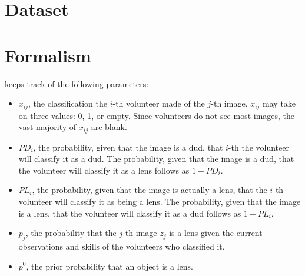 \documentclass[useAMS,usenatbib,a4paper]{mn2e}
\begin{document}

\section{Dataset}



\section{Formalism}
\label{sec:formalism}


\sw keeps track of the following parameters:
\begin{itemize}
  \item{$x_{ij}$, the classification the $i$-th volunteer made of the $j$-th
      image. $x_{ij}$ may take on three values:
      0, 1, or empty. Since volunteers do not see most images, the vast
    majority of $x_{ij}$ are blank.}
    \item{$PD_{i}$, the probability, given that the image is a dud, that
        $i$-th the volunteer will classify it as a dud. The
      probability, given that the image is a dud, that the volunteer will
    classify it as a lens follows as $1 - PD_{i}$.}
  \item{$PL_{i}$, the probability, given that the image is actually a
      lens, that the $i$-th volunteer will classify it as being a lens. The
      probability, given that the image is a lens, that the volunteer will
    classify it as a dud follows as $1 - PL_{i}$.}
  \item{$p_j$, the probability that
      the $j$-th image $z_{j}$ is a lens given the current observations and skills of the
  volunteers who classified it.}
  \item{$p^{0}$, the prior probability that an object is a lens.}
\end{itemize}
\end{document}
